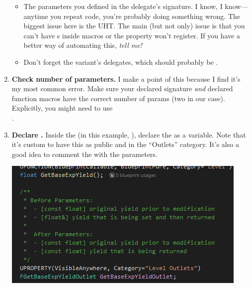 \begin{enumerate}
{\begin{itemize}
{\begin{tcolorbox}[colback=gray!20!white,colframe=blue!75!black,title=Priorities]
	 \end{tcolorbox}\vspace*{12pt}
			}
			\item{The parameters you defined in the delegate's signature. I know, I know---anytime you repeat code, you're probably doing something wrong. The biggest issue here is the UHT. The main (but not only) issue is that you can't have s inside macros or the property won't register. If you have a better way of automating this, \textit{tell me!}}
			\item{Don't forget the  variant's delegates, which should probably be .}
		\end{itemize}
	}
	\item{\textbf{Check number of parameters.} I make a point of this because I find it's my most common error. Make sure your declared signature \textit{and} declared  function macros have the correct number of params (two in our case). Explicitly, you might need to use\\.}
	\item{\textbf{Declare .} Inside the  (in this example, ), declare the  as a variable. Note that it's custom to have this  as public and in the ``Outlets'' category. It's also a good idea to comment the  with the parameters.
	\begin{center}
		\includegraphics[scale=\ScreenshotScale]{create-outlet-uproperty}
	\end{center}
	
}
\end{enumerate}
